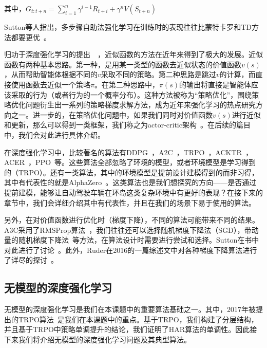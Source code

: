       \par 其中，$G_{t:t+n} = \sum_{i = 1}^{n}\gamma^{i-1}R_{t+i} + \gamma^n V(S_{t+n})$
      \par Sutton等人指出，多步骤自助法强化学习在训练时的表现往往比蒙特卡罗和TD方法都要更优~\cite{Sutton_book}。
      \par 归功于深度强化学习的提出~\cite{atari_2013}~\cite{deepRL_overview}，近似函数的方法在近年来得到了极大的发展。近似函数有两种基本思路。第一种，是用某一类型的函数去近似状态的价值函数$v(s)$，从而帮助智能体根据不同的$v$采取不同的策略。第二种思路是跳过$v$的计算，而直接使用函数去近似一个策略$\pi$。在第二种思路中，$\pi(s)$的输出将直接是智能体应该采取的行为（或者行为的一个概率分布）。这种方法被称为``策略优化''，围绕策略优化问题衍生出一系列的策略梯度求解方法，成为近年来强化学习的热点研究方向之一。进一步的，在策略优化问题中，如果我们同时对价值函数$v(s)$进行近似和更新，那么可以得到一类框架，我们称之为actor-critic架构~\cite{Sutton_book}。在后续的篇目中，我们会对此进行具体介绍。\par
      在深度强化学习中，比较著名的算法有DDPG~\cite{DDPG}，A2C~\cite{A3C}，TRPO~\cite{TRPO}，ACKTR~\cite{ACKTR}，ACER~\cite{ACER}，PPO~\cite{PPO}等。这些算法全部忽略了环境的模型，或者环境模型是学习得到的（TRPO）。还有一类算法，其中的环境模型是提前设计建模得到的而非习得，其中有代表性的就是AlphaZero~\cite{AlphaZero}。这类算法也是我们想探究的方向——是否通过提前建模，能够让自动驾驶车辆在环岛这类复杂环境中有更好的表现？在接下来的章节中，我们会详细介绍其中有代表性，并且在我们的场景下易于使用的算法。\par
      另外，在对价值函数进行优化时（梯度下降），不同的算法可能带来不同的结果。A3C采用了RMSProp算法~\cite{RMSProp}，我们往往还可以选择随机梯度下降法（SGD），带动量的随机梯度下降法~\cite{SGD_momentum}等方法，在算法设计时需要进行尝试和选择。Sutton在书中对此进行了讨论~\cite{Sutton_book}。此外，Ruder在2016的一篇综述文中对各种梯度下降算法进行了详尽的探讨~\cite{GD_overview}。
      
    \subsection{无模型的深度强化学习}
      无模型的深度强化学习是我们在本课题中的重要算法基础之一。其中，2017年被提出的TRPO算法~\cite{TRPO}是我们在本课题中的重点。基于TRPO，我们构建了分层结构，并且基于TRPO中策略单调提升的结论，我们证明了HAR算法的单调性。因此接下来我们将介绍无模型的深度强化学习问题及其典型算法。
      

